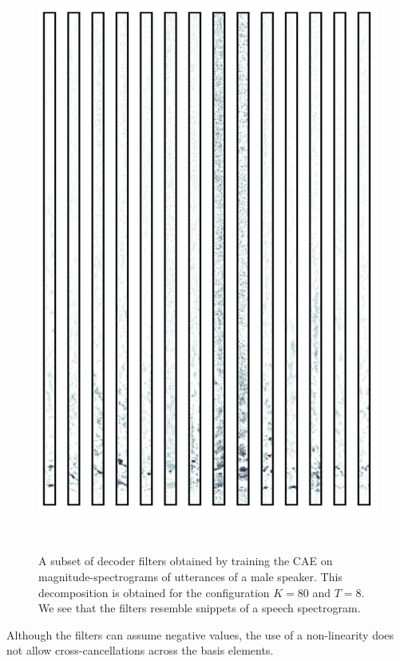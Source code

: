\documentclass{article}
\begin{document}
\begin{figure}[ht!]
\centering
  \includegraphics[clip, trim = 0cm 0cm 0cm 0cm, width=\columnwidth, height = \columnwidth]{Figs/Bases.png}
  \caption{A subset of decoder filters obtained by training the CAE on magnitude-spectrograms of utterances of a male speaker. This decomposition is obtained for the configuration $K = 80$ and $T = 8$. We see that the filters resemble snippets of a speech spectrogram.}~\label{fig:cnn_demo_speech}
\end{figure}
Although the filters can assume negative values, the use of a non-linearity does not allow cross-cancellations across the basis elements. \\
\end{document}
